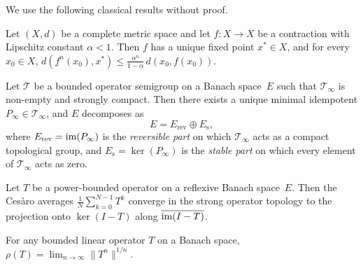 We use the following classical results without proof.

\begin{theorem}\label{thm:banach}
  Let $(X,d)$ be a complete metric space and let $f\colon X\to X$ be a
  contraction with Lipschitz constant $\alpha<1$. Then $f$ has a unique fixed
  point $x^*\in X$, and for every $x_0\in X$,
  $d(f^n(x_0),x^*)\leq\frac{\alpha^n}{1-\alpha}\,d(x_0,f(x_0))$.
\end{theorem}

\begin{theorem}\label{thm:jdlg-prereq}
  Let $\mathcal{T}$ be a bounded operator semigroup on a Banach space~$E$ such
  that $\mathcal{T}_\infty$ is non-empty and strongly compact. Then there
  exists a unique minimal idempotent $P_\infty\in\mathcal{T}_\infty$, and $E$
  decomposes as
  \[
    E = E_{\mathrm{rev}}\oplus E_{\mathrm{s}},
  \]
  where $E_{\mathrm{rev}}=\operatorname{im}(P_\infty)$ is the \emph{reversible part} on which
  $\mathcal{T}_\infty$ acts as a compact topological group, and
  $E_{\mathrm{s}}=\ker(P_\infty)$ is the \emph{stable part} on which every
  element of $\mathcal{T}_\infty$ acts as zero.
\end{theorem}

\begin{theorem}\label{thm:mean-ergodic}
  Let $T$ be a power-bounded operator on a reflexive Banach space~$E$. Then the
  Ces\`aro averages $\frac{1}{N}\sum_{k=0}^{N-1}T^k$ converge in the strong
  operator topology to the projection onto $\ker(I-T)$ along
  $\overline{\operatorname{im}(I-T)}$.
\end{theorem}

\begin{theorem}\label{thm:gelfand}
  For any bounded linear operator $T$ on a Banach space,
  $\rho(T)=\lim_{n\to\infty}\|T^n\|^{1/n}$.
\end{theorem}
